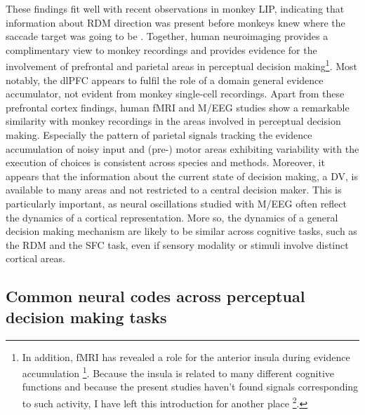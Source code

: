 These findings fit well with recent observations in monkey LIP, indicating that information about RDM direction was present before monkeys knew where the saccade target was going to be \parencite{Bennur2011}. 
Together, human neuroimaging provides a complimentary view to monkey recordings and provides evidence for the involvement of prefrontal and parietal areas in perceptual decision making\footnote{In addition, fMRI has revealed a role for the anterior insula during evidence accumulation \footcite{Ho2009,Liu2011}. Because the insula is related to many different cognitive functions and because the present studies haven’t found signals corresponding to such activity, I have left this introduction for another place \footcite{Menon2010}.}. Most notably, the dlPFC appears to fulfil the role of a domain general evidence accumulator, not evident from monkey single-cell recordings. Apart from these prefrontal cortex findings, human fMRI and M/EEG studies show a remarkable similarity with monkey recordings in the areas involved in perceptual decision making. Especially the pattern of parietal signals tracking the evidence accumulation of noisy input and (pre-) motor areas exhibiting variability with the execution of choices is consistent across species and methods. Moreover, it appears that the information about the current state of decision making, a DV, is available to many areas and not restricted to a central decision maker. This is particularly important, as neural oscillations studied with M/EEG often reflect the dynamics of a cortical representation. More so, the dynamics of a general decision making mechanism are likely to be similar across cognitive tasks, such as the RDM and the SFC task, even if sensory modality or stimuli involve distinct cortical areas.

\subsection{Common neural codes across perceptual decision making tasks}

